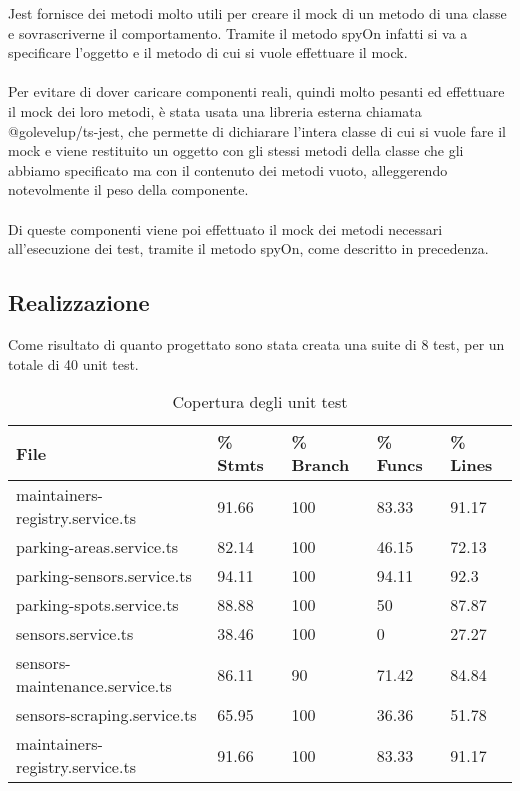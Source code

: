 Jest fornisce dei metodi molto utili per creare il \gls{mock} di un metodo di una classe e sovrascriverne il comportamento.
Tramite il metodo spyOn infatti si va a specificare l'oggetto e il metodo di cui si vuole effettuare il \gls{mock}.
\\\\
Per evitare di dover caricare componenti reali, quindi molto pesanti ed effettuare il \gls{mock} dei loro metodi, è stata
usata una libreria esterna chiamata @golevelup/ts-jest, che permette di dichiarare l'intera classe di cui si vuole fare
il \gls{mock} e viene restituito un oggetto con gli stessi metodi della classe che gli abbiamo specificato ma con il contenuto 
dei metodi vuoto, 
alleggerendo notevolmente il peso della componente.
\\\\
Di queste componenti viene poi effettuato il \gls{mock} dei metodi necessari all'esecuzione dei test, tramite il metodo
spyOn, come descritto in precedenza.
\clearpage
\subsection{Realizzazione}
Come risultato di quanto progettato sono stata creata una suite di 8 test, per un totale di 40 unit test.
\begin{table}[H]
    \begin{tabular}{|p{4.8cm}|p{1.5cm}|p{1.7cm}|p{1.5cm}| p{1.4cm} |} 
    \hline
    \textbf{File} & \textbf{\% Stmts} & \textbf{\% Branch} &  \textbf{\% Funcs} & \textbf{\% Lines} \\ 
    \hline
    maintainers-registry.service.ts & 91.66 & 100 & 83.33 & 91.17 \\ 
    \hline
    parking-areas.service.ts & 82.14 & 100 & 46.15 & 72.13 \\ 
    \hline
    parking-sensors.service.ts & 94.11 & 100 & 94.11 & 92.3 \\ 
    \hline
    parking-spots.service.ts & 88.88 & 100 & 50 & 87.87 \\ 
    \hline
    sensors.service.ts & 38.46 & 100 & 0 & 27.27 \\ 
    \hline
    sensors-maintenance.service.ts & 86.11 & 90 & 71.42 & 84.84 \\ 
    \hline
    sensors-scraping.service.ts & 65.95 & 100 & 36.36 & 51.78 \\ 
    \hline
    maintainers-registry.service.ts & 91.66 & 100 & 83.33 & 91.17 \\ 
    \hline
    \end{tabular}
    \caption{Copertura degli unit test}
\end{table}


